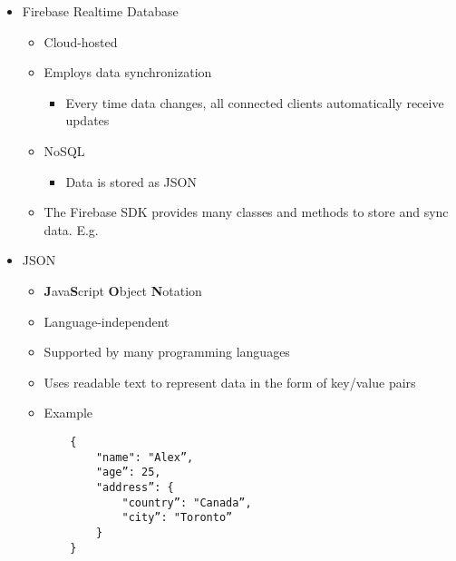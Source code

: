 \begin{itemize}
	\item Firebase Realtime Database
	\begin{itemize}
		\item Cloud-hosted
		\item Employs data synchronization
		\begin{itemize}
			\item Every time data changes, all connected clients automatically receive updates
		\end{itemize}
		\item NoSQL
		\begin{itemize}
			\item Data is stored as JSON
		\end{itemize}
		\item The Firebase SDK provides many classes and methods to store and sync data. E.g.
	\end{itemize}

	\item JSON
	\begin{itemize}
		\item \textbf{J}ava\textbf{S}cript \textbf{O}bject \textbf{N}otation
		\item Language-independent
		\item Supported by many programming languages
		\item Uses readable text to represent data in the form of key/value pairs
		\item Example \begin{Verbatim}
	{
		"name": "Alex”,
		"age”: 25,
		"address”: {
			"country”: "Canada”,
			"city”: "Toronto”
		}
	}
		\end{Verbatim}

	\end{itemize}
\end{itemize}

%
